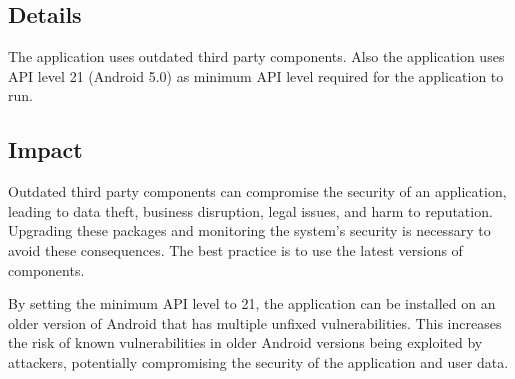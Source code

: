 %
%
%
%
\renewcommand{\FindingAuthor}{Michal Olencin}
\renewcommand{\FindingName}{Outdated Components}
\renewcommand{\Location}{dummyapplication.apk, dummyapplication.ipa}
\renewcommand{\Component}{Multiple}
\renewcommand{\FoundWith}{Manual testing}
\renewcommand{\TestMethod}{Manual}
\renewcommand{\CVSS}{2.5}
\renewcommand{\CVSSvector}{CVSS:3.1/AV:L/AC:H/PR:L/UI:N/S:U/C:L/I:N/A:N}
\renewcommand{\CWE}{1104}
\renewcommand{\Criticality}{Low}
\renewcommand{\Exploitability}{Hard}
\renewcommand{\Category}{Undefined}
\renewcommand{\Detectability}{Easy}


\ReportFindingHeader{\FindingName}



\subsection*{Details}

The application uses outdated third party components.
Also the application uses API level 21 (Android 5.0) as minimum API level required for the application to run.





\subsection*{Impact}

Outdated third party components can compromise the security of an application, leading to data theft, business disruption, legal issues, and harm to reputation.
Upgrading these packages and monitoring the system's security is necessary to avoid these consequences.
The best practice is to use the latest versions of components.

By setting the minimum API level to 21, the application can be installed on an older version of Android that has multiple unfixed vulnerabilities.
This increases the risk of known vulnerabilities in older Android versions being exploited by attackers, potentially compromising the security of the application and user data.

